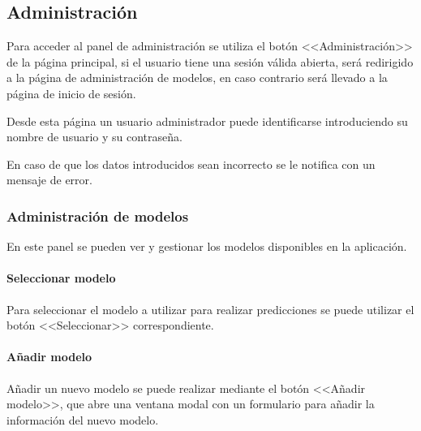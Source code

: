 \subsection{Administración}

Para acceder al panel de administración se utiliza el botón <<Administración>>
de la página principal, si el usuario tiene una sesión válida abierta, será
redirigido a la página de administración de modelos, en caso contrario será
llevado a la página de inicio de sesión.


Desde esta página un usuario administrador puede identificarse introduciendo su
nombre de usuario y su contraseña.

En caso de que los datos introducidos sean incorrecto se le notifica con un
mensaje de error.


\subsubsection{Administración de modelos}

En este panel se pueden ver y gestionar los modelos disponibles en la
aplicación.

\paragraph{Seleccionar modelo}

Para seleccionar el modelo a utilizar para realizar predicciones se puede
utilizar el botón <<Seleccionar>> correspondiente.


\paragraph{Añadir modelo}

Añadir un nuevo modelo se puede realizar mediante el botón <<Añadir modelo>>,
que abre una ventana modal con un formulario para añadir la información del
nuevo modelo.
